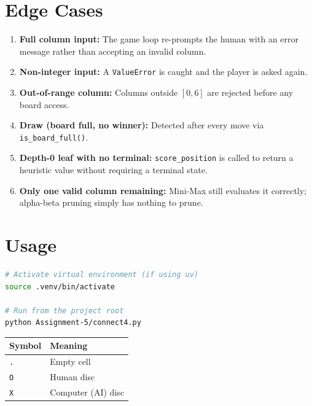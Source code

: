 \documentclass[12pt]{article}
\begin{document}
\section{Edge Cases}

\begin{enumerate}
    \item \textbf{Full column input:}
          The game loop re-prompts the human with an error message rather
          than accepting an invalid column.
    \item \textbf{Non-integer input:}
          A \texttt{ValueError} is caught and the player is asked again.
    \item \textbf{Out-of-range column:}
          Columns outside $[0, 6]$ are rejected before any board access.
    \item \textbf{Draw (board full, no winner):}
          Detected after every move via \texttt{is\_board\_full()}.
    \item \textbf{Depth-0 leaf with no terminal:}
          \texttt{score\_position} is called to return a heuristic value
          without requiring a terminal state.
    \item \textbf{Only one valid column remaining:}
          Mini-Max still evaluates it correctly; alpha-beta pruning simply
          has nothing to prune.
\end{enumerate}

\section{Usage}

\begin{lstlisting}[language=bash, caption={Running the game.}]
# Activate virtual environment (if using uv)
source .venv/bin/activate

# Run from the project root
python Assignment-5/connect4.py
\end{lstlisting}

\begin{center}
\begin{tabular}{@{} l l @{}}
\toprule
\textbf{Symbol} & \textbf{Meaning} \\
\midrule
\texttt{.} & Empty cell \\
\texttt{O} & Human disc \\
\texttt{X} & Computer (AI) disc \\
\bottomrule
\end{tabular}
\end{center}
\end{document}
